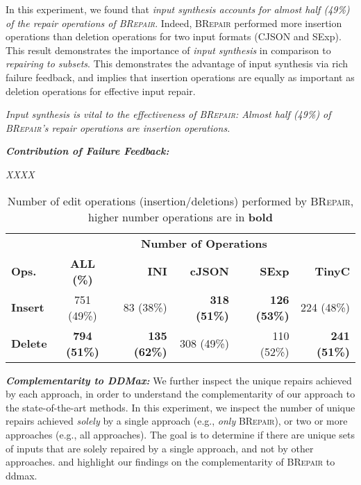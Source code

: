 \documentclass[sigconf,review,anonymous]{acmart}
\newenvironment{result}{\begin{framed}\centering\it}{\end{framed}}
\newcounter{todocounter}
\newcommand{\todo}[1]{\marginpar{$|$}\textcolor{red}{\stepcounter{todocounter}\footnote[\thetodocounter]{\textcolor{red}{\textbf{TODO }}\textit{#1}}}}
\renewcommand{\todo}[1]{}
\newcommand{\approach}{\textsc{BRepair}\xspace}
\newcommand{\ddmax}{\textit{DDMax}\xspace}
\begin{document}
In this experiment, we found that \textit{input synthesis accounts for almost half (49\%) of the repair operations of \approach}. Indeed, \approach performed more insertion operations than deletion operations for two input formats (CJSON and SExp). This result demonstrates the importance of \textit{input synthesis} in comparison to \textit{repairing to subsets}. This demonstrates the advantage of input synthesis via rich failure feedback, and implies that insertion operations are equally as important as deletion operations for effective input repair.

\begin{result}
Input synthesis is vital to the effectiveness of \approach: Almost half (49\%) of \approach's repair operations are %
insertion operations. %
\end{result}



\noindent
\textbf{\textit{Contribution of Failure Feedback:}}
\todo{discuss the contribution of the incomplete oracle ... }


\begin{result}
XXXX
\end{result}



\begin{table}[!tbp]\centering
\caption{Number of edit operations (insertion/deletions) performed by \approach, higher number operations are in \textbf{bold}}
\small
\begin{tabular}{|l | c | r  r  r  r |}
\hline
&  \multicolumn{5}{c|}{\textbf{Number of  Operations}}  \\
\textbf{Ops.} & \textbf{ALL (\%)} & \textbf{INI} & \textbf{cJSON} & \textbf{SExp} & \textbf{TinyC} \\
\hline
\textbf{Insert} & 751 (49\%) & 83 (38\%) &	\textbf{318 (51\%)} &	\textbf{126 (53\%)} &	224 (48\%) \\
\textbf{Delete}  & \textbf{794 (51\%)} & \textbf{135 (62\%)} &	308 (49\%) &	110 (52\%) &	\textbf{241 (51\%)} \\
\hline
\end{tabular}
\label{tab:brepair-insertions}
\end{table}



\noindent \textbf{\textit{Complementarity to \ddmax:}} We further inspect the unique repairs achieved by each approach, in order to understand the complementarity of our approach to the state-of-the-art methods. In this experiment, we inspect the number of unique repairs achieved \textit{solely} by a single approach (e.g., \textit{only} \approach), or two or more approaches (e.g., all approaches).  The goal is to determine if there are unique sets of inputs that are solely repaired by a single approach, and not by other approaches.  and  highlight our findings on the complementarity of \approach to ddmax.
\end{document}
